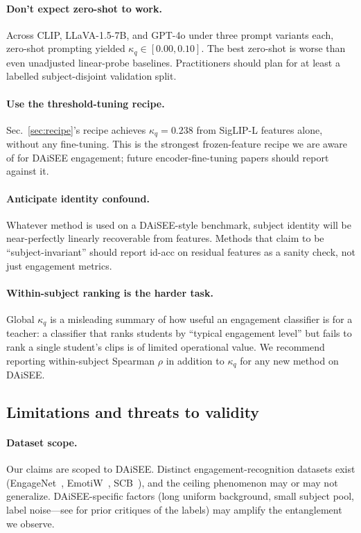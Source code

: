 \paragraph{Don't expect zero-shot to work.} Across CLIP, LLaVA-1.5-7B,
and GPT-4o under three prompt variants each, zero-shot prompting
yielded $\kappa_q \in [0.00, 0.10]$. The best zero-shot is worse
than even unadjusted linear-probe baselines. Practitioners should
plan for at least a labelled subject-disjoint validation split.

\paragraph{Use the threshold-tuning recipe.} Sec.~\ref{sec:recipe}'s
recipe achieves $\kappa_q = 0.238$ from SigLIP-L features alone,
without any fine-tuning. This is the strongest frozen-feature
recipe we are aware of for DAiSEE engagement; future
encoder-fine-tuning papers should report against it.

\paragraph{Anticipate identity confound.} Whatever method is used
on a DAiSEE-style benchmark, subject identity will be near-perfectly
linearly recoverable from features. Methods that claim to be
``subject-invariant'' should report id-acc on residual features as
a sanity check, not just engagement metrics.

\paragraph{Within-subject ranking is the harder task.} Global
$\kappa_q$ is a misleading summary of how useful an engagement
classifier is for a teacher: a classifier that ranks students by
``typical engagement level'' but fails to rank a single student's
clips is of limited operational value. We recommend reporting
within-subject Spearman $\rho$ in addition to $\kappa_q$ for any
new method on DAiSEE.

\subsection{Limitations and threats to validity}

\paragraph{Dataset scope.} Our claims are scoped to DAiSEE.
Distinct engagement-recognition datasets exist
(EngageNet~\cite{khare2024engagenet}, EmotiW~\cite{dhall2017emotiw},
SCB~\cite{wang2024scb}), and the ceiling phenomenon may or may not
generalize. DAiSEE-specific factors (long uniform background, small
subject pool, label noise---see \cite{kaur2021label} for prior
critiques of the labels) may amplify the entanglement we observe.

